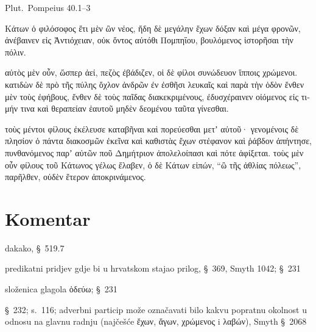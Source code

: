 Plut.\ Pompeius 40.1–3


\medskip


{\large

\begin{greek}

\noindent  Κάτων ὁ φιλόσοφος ἔτι μὲν ὢν νέος, ἤδη δὲ μεγάλην ἔχων δόξαν καὶ μέγα φρονῶν, ἀνέβαινεν εἰς Ἀντιόχειαν, οὐκ ὄντος αὐτόθι Πομπηΐου, βουλόμενος ἱστορῆσαι τὴν πόλιν.

\noindent αὐτὸς μὲν οὖν, ὥσπερ ἀεί, πεζὸς ἐβάδιζεν, οἱ δὲ φίλοι συνώδευον ἵπποις χρώμενοι. κατιδὼν δὲ πρὸ τῆς πύλης ὄχλον ἀνδρῶν ἐν ἐσθῆσι λευκαῖς καὶ παρὰ τὴν ὁδὸν ἔνθεν μὲν τοὺς ἐφήβους, ἔνθεν δὲ τοὺς παῖδας διακεκριμένους, ἐδυσχέραινεν οἰόμενος εἰς τιμήν τινα καὶ θεραπείαν ἑαυτοῦ μηδὲν δεομένου ταῦτα γίνεσθαι.

\noindent τοὺς μέντοι φίλους ἐκέλευσε καταβῆναι καὶ πορεύεσθαι μετʼ αὐτοῦ· γενομένοις δὲ πλησίον ὁ πάντα διακοσμῶν ἐκεῖνα καὶ καθιστὰς ἔχων στέφανον καὶ ῥάβδον ἀπήντησε, πυνθανόμενος παρʼ αὐτῶν ποῦ Δημήτριον ἀπολελοίπασι καὶ πότε ἀφίξεται. τοὺς μὲν οὖν φίλους τοῦ Κάτωνος γέλως ἔλαβεν, ὁ δὲ Κάτων εἰπών, ``ὢ τῆς ἀθλίας πόλεως'', παρῆλθεν, οὐδὲν ἕτερον ἀποκρινάμενος.

\end{greek}

}

\newpage

\section*{Komentar}



\begin{description}[noitemsep]
\item[μὲν οὖν] dakako, §~519.7
\item[πεζὸς ἐβάδιζεν] predikatni pridjev gdje bi u hrvatskom stajao prilog, §~369, Smyth 1042; §~231
\item[συνώδευον] složenica glagola ὁδεύω; §~231
\item[χρώμενοι] §~232; s.~116; adverbni particip može označavati bilo kakvu popratnu okolnost u odnosu na glavnu radnju (najčešće ἔχων, ἄγων, χρώμενος i λαβών), Smyth §~2068
\end{description}



